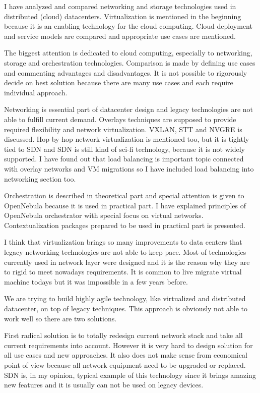 
I have analyzed and compared networking and storage technologies used in distributed (cloud) datacenters. Virtualization is mentioned in the beginning because it is an enabling technology for the cloud computing. Cloud deployment and service models are compared and appropriate use cases are mentioned.

The biggest attention is dedicated to cloud computing, especially to networking, storage and orchestration technologies. Comparison is made by defining use cases and commenting advantages and disadvantages. It is not possible to rigorously decide on best solution because there are many use cases and each require individual approach.

Networking is essential part of datacenter design and legacy technologies are not able to fulfill current demand. Overlays techniques are supposed to provide required flexibility and network virtualization. \Ac{VXLAN}, \Ac{STT} and \Ac{NVGRE} is discussed. Hop-by-hop network virtualization is mentioned too, but it is tightly tied to \Ac{SDN} and \Ac{SDN} is still kind of sci-fi technology, because it is not widely supported.  
I have found out that load balancing is important topic connected with overlay networks and \Ac{VM} migrations so I have included load balancing into networking section too.


Orchestration is described in theoretical part and special attention is given to OpenNebula because it is used in practical part. I have explained principles of OpenNebula orchestrator with special focus on virtual networks. Contextualization packages prepared to be used in practical part is presented.

I think that virtualization brings so many improvements to data centers that legacy networking technologies are not able to keep pace. Most of technologies currently used in network layer were designed and it is the reason why they are to rigid to meet nowadays requirements. It is common to live migrate virtual machine todays but it was impossible in a few years before.

We are trying to build highly agile technology, like virtualized and distributed datacenter, on top of legacy techniques. This approach is obviously not able to work well so there are two solutions. 

First radical solution is to totally redesign current network stack and take all current requirements into account. However it is very hard to design solution for all use cases and new approaches. It also does not make sense from economical point of view because all network equipment need to be upgraded or replaced. \Ac{SDN} is, in my opinion, typical example of this technology since it brings amazing new features and it is usually can not be used on legacy devices.


